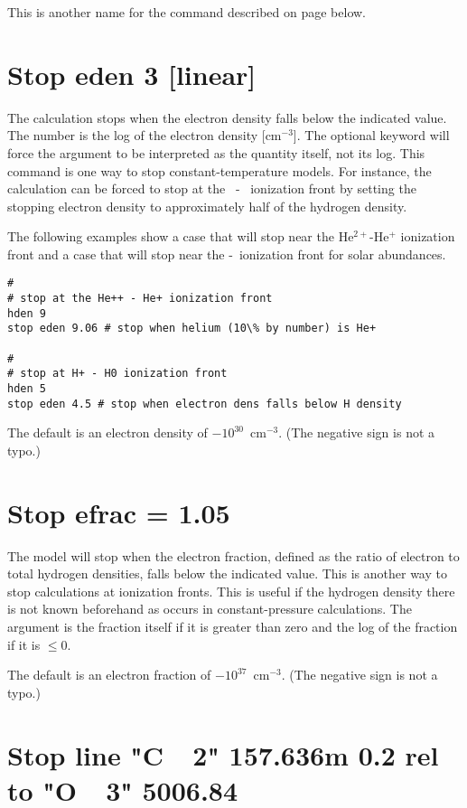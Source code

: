 This is another name for the  command
described on page \pageref{sec:CommandStopThckness} below.

\section{Stop eden 3 [linear]}

The calculation stops when the electron density falls below the
indicated value.
The number is the log of the electron density [cm$^{-3}$].
The optional
keyword  will force the argument to be interpreted as the quantity
itself, not its log.
This command is one way to stop constant-temperature
models.
For instance, the calculation can be forced to stop at the
\hplus\ - \hO\
ionization front by setting the stopping electron density to approximately
half of the hydrogen density.

The following examples show a case that will stop
near the
He$^{2+}$-He$^+$
ionization front and a case that will stop near
the \hplus-\hO\ ionization front
for solar abundances.
\begin{verbatim}
#
# stop at the He++ - He+ ionization front
hden 9
stop eden 9.06 # stop when helium (10\% by number) is He+

#
# stop at H+ - H0 ionization front
hden 5
stop eden 4.5 # stop when electron dens falls below H density
\end{verbatim}
The default is an electron density of $-10^{30}$~cm$^{-3}$.
(The negative sign
is not a typo.)

\section{Stop efrac = 1.05}

The model will stop when the electron fraction, defined as the ratio
of electron to total hydrogen densities, falls below the indicated value.
This is another way to stop calculations at ionization fronts.  This is
useful if the hydrogen density there is not known beforehand as occurs in
constant-pressure calculations.  The argument is the fraction itself if
it is greater than zero and the log of the fraction if it is $\le 0$.

The default is an electron fraction of $-10^{37}$~cm$^{-3}$.
(The negative sign is not a typo.)

\section{Stop line "C~~2" 157.636m 0.2 rel to  "O~~3" 5006.84}

